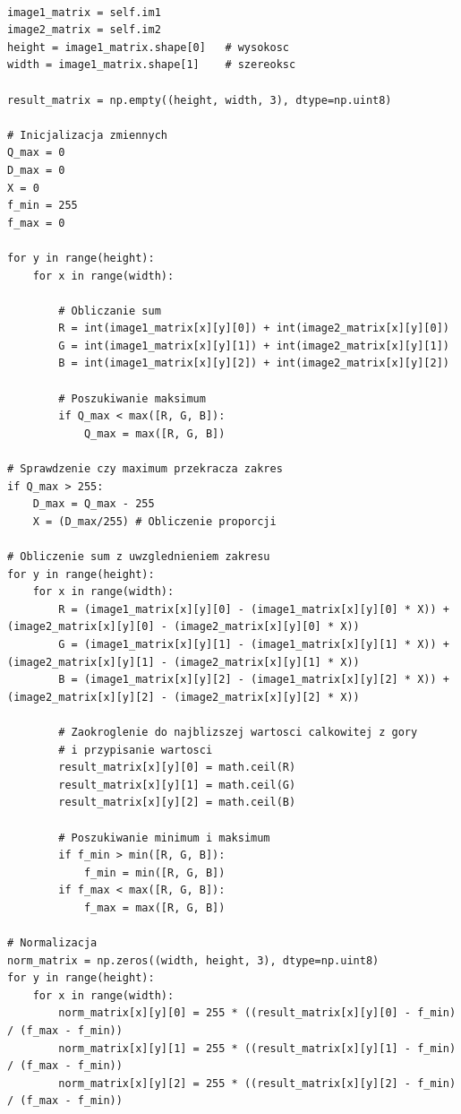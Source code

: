 \documentclass[final,a4paper,openany,12pt]{mwbk}
\begin{document}
\begin{lstlisting}[caption=Sumowanie obrazów barwowych]

image1_matrix = self.im1
image2_matrix = self.im2
height = image1_matrix.shape[0]   # wysokosc
width = image1_matrix.shape[1]    # szereoksc

result_matrix = np.empty((height, width, 3), dtype=np.uint8)

# Inicjalizacja zmiennych
Q_max = 0
D_max = 0
X = 0
f_min = 255
f_max = 0

for y in range(height):
    for x in range(width):  

        # Obliczanie sum
        R = int(image1_matrix[x][y][0]) + int(image2_matrix[x][y][0])
        G = int(image1_matrix[x][y][1]) + int(image2_matrix[x][y][1])
        B = int(image1_matrix[x][y][2]) + int(image2_matrix[x][y][2])
        
        # Poszukiwanie maksimum               
        if Q_max < max([R, G, B]):
            Q_max = max([R, G, B])

# Sprawdzenie czy maximum przekracza zakres
if Q_max > 255:
    D_max = Q_max - 255
    X = (D_max/255) # Obliczenie proporcji

# Obliczenie sum z uwzglednieniem zakresu
for y in range(height):
    for x in range(width): 
        R = (image1_matrix[x][y][0] - (image1_matrix[x][y][0] * X)) + (image2_matrix[x][y][0] - (image2_matrix[x][y][0] * X))
        G = (image1_matrix[x][y][1] - (image1_matrix[x][y][1] * X)) + (image2_matrix[x][y][1] - (image2_matrix[x][y][1] * X))
        B = (image1_matrix[x][y][2] - (image1_matrix[x][y][2] * X)) + (image2_matrix[x][y][2] - (image2_matrix[x][y][2] * X))

        # Zaokroglenie do najblizszej wartosci calkowitej z gory
        # i przypisanie wartosci
        result_matrix[x][y][0] = math.ceil(R)
        result_matrix[x][y][1] = math.ceil(G)
        result_matrix[x][y][2] = math.ceil(B)

        # Poszukiwanie minimum i maksimum                
        if f_min > min([R, G, B]):
            f_min = min([R, G, B])
        if f_max < max([R, G, B]):
            f_max = max([R, G, B])

# Normalizacja
norm_matrix = np.zeros((width, height, 3), dtype=np.uint8)
for y in range(height):
    for x in range(width):
        norm_matrix[x][y][0] = 255 * ((result_matrix[x][y][0] - f_min) / (f_max - f_min))
        norm_matrix[x][y][1] = 255 * ((result_matrix[x][y][1] - f_min) / (f_max - f_min))
        norm_matrix[x][y][2] = 255 * ((result_matrix[x][y][2] - f_min) / (f_max - f_min))
\end{lstlisting}
\end{document}
